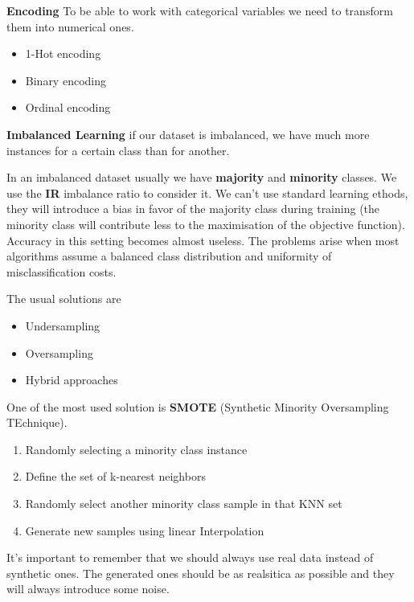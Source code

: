 \textbf{Encoding} \ra To be able to work with categorical variables we need to transform them into numerical ones.

\begin{itemize}
    \item 1-Hot encoding
    \item Binary encoding
    \item Ordinal encoding
\end{itemize}

\textbf{Imbalanced Learning} \ra if our dataset is imbalanced, we have much more instances for a certain class than for another.

\vspace{10pt}

In an imbalanced dataset usually we have \textbf{majority} and \textbf{minority} classes. We use the \textbf{IR} imbalance ratio to consider it. 
We can't use standard learning ethods, they will introduce a bias in favor of the majority class during training (the minority class will contribute less to the maximisation of the objective function).
Accuracy in this setting becomes almost useless. The problems arise when most algorithms assume a balanced class distribution and uniformity of misclassification costs.

\vspace{10pt}

The usual solutions are

\begin{itemize}
    \item Undersampling
    \item Oversampling
    \item Hybrid approaches
\end{itemize}

One of the most used solution is \textbf{SMOTE} (Synthetic Minority Oversampling TEchnique). 

\begin{enumerate}
    \item Randomly selecting a minority class instance
    \item Define the set of k-nearest neighbors
    \item Randomly select another minority class sample in that KNN set
    \item Generate new samples using linear Interpolation
\end{enumerate}

It's important to remember that we should always use real data instead of synthetic ones. The generated ones should be as realsitica as possible and they will always introduce some noise.


